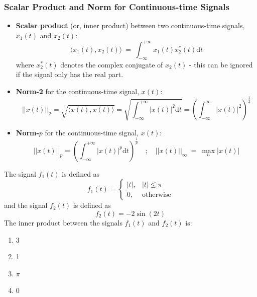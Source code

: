 \subsubsection{Scalar Product and Norm for Continuous-time Signals}
\begin{itemize}
    \item \textbf{Scalar product} (or, inner product) between two continuous-time signals, $x_1(t)$ and $x_2(t)$:
    \[
        \langle x_{1}(t), x_{2}(t) \rangle \ = \ \int_{-\infty}^{+\infty}  x_{1}(t) x_{2}^{*}(t) \mathrm{d}t 
    \]
    where $x_{2}^{*}(t)$ denotes the complex conjugate of $x_2(t)$ - this can be ignored if the signal only has the real part.
    
    \item \textbf{Norm-2} for the continuous-time signal,  $x(t)$:
    \[ 
        \lvert \lvert x(t) \rvert \rvert_{2} = \sqrt{\langle x(t), x(t) \rangle} = \sqrt{\int_{-\infty}^{+\infty}\lvert x(t) \rvert^{2} \mathrm{d}t} = \left( \int_{-\infty}^{\infty} \lvert x(t) \rvert^{2} \right) ^{\frac{1}{2}} 
    \]
    
    \item \textbf{Norm-$p$} for the continuous-time signal, $x(t)$:
    \[
        \lvert \lvert x(t) \rvert \rvert_{p} =\left( \int_{-\infty}^{+\infty} \lvert x(t) \rvert^{p} \mathrm{d}t \right)^{\frac{1}{p}}\quad ; \quad \lvert \lvert x(t) \rvert \rvert_{\infty} \ = \ \max_{n}  \lvert x(t) \rvert 
    \]
\end{itemize}

\begin{q}{}
The signal $f_1(t)$ is defined as
\[
    f_1(t) = \begin{cases}
        \lvert t \rvert, & \lvert t \rvert \leq \pi \\
        0, & \text{otherwise}
    \end{cases}
\]
and the signal $f_2 (t)$ is defined as
\[
    f_2 (t) = -2 \sin(2t)
\]
The inner product between the signals $f_1(t)$ and $f_2(t)$ is:
\begin{multicols}{2}
\begin{enumerate}[label=(\alph*)]
    \item 3
    \item 1
    \item $\pi$
    \item 0
\end{enumerate} 
\end{multicols}
\end{q}
 
